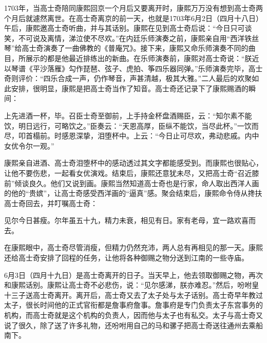 
1703年，当高士奇陪同康熙回京一个月后又要离开时，康熙万万没有想到高士奇两个月后就遽然离世。在高士奇离京的前一天，也就是1703年6月2日（四月十八日）午后，康熙邀高士奇听曲，并与其话别。康熙在见到高士奇后说：“今日只可谈笑，不可说及离情，涕泣使不尽欢。”在内廷乐师演奏之前，康熙亲自用“西洋铁丝琴”给高士奇演奏了一曲佛教的《普庵咒》。接下来，康熙又命乐师演奏不同的曲目，所展示的都是他最近排练出的新曲。在乐师演奏前，康熙对高士奇说：“朕近以琴谱《平沙落雁》勾作琵琶、弦子、虎拍、筝四乐器同弹。”乐师演奏完毕，高士奇则评价：“四乐合成一声，仍作琴音，声甚清越，极其大雅。”二人最后的欢聚如此安排，很明显，康熙是把高士奇当作了知音。高士奇还记录下了康熙赐酒的瞬间：



\begin{bookquote}上先进酒一杯，毕。召臣士奇至御前，上手持金杯盘酒赐臣，云：“知尔素不能饮，明日远行，可略饮之。”臣奏云：“天恩高厚，臣纵不能饮，当尽此杯。”一饮而尽，叩首榻前。时感恩深挚，泪堕杯中。上云：“今日止可尽欢，弗动悲戚。内中女优令尔一观。”\end{bookquote}


康熙亲自进酒、高士奇泪堕杯中的感动透过其文字都能感受到。而康熙也很贴心，让他不要伤悲，一起看女优演戏。结束后，康熙还意犹未尽，又把高士奇“召近膝前”倾谈良久。他们又说到画。康熙当然知道高士奇也是行家，命人取出西洋人画的他的“贵嫔”，让高士奇感受西洋画的“逼真”感。聚会结束后，康熙命令侍从搀扶高士奇回去，并叮嘱高士奇：



\begin{bookquote}见尔今日甚瘦。尔年虽五十九，精力未衰，相见有日。家有老母，宜一路欢喜而去。\end{bookquote}


在康熙眼中，高士奇尽管消瘦，但精力仍然充沛，两人总有再相见的那一天。康熙还给高士奇安排了回程的任务，让他将各种御赐之物分送到江南的一些寺庙。



6月3日（四月十九日）是高士奇离开的日子。当天早上，他去领取御赐之物，再次和康熙话别。康熙让高士奇不必悲伤，说：“见尔感涕，朕亦难忍。”然后，吩咐皇十三子送高士奇离开。离开后，高士奇又去了太子处与太子话别。高士奇早年教过太子，很长时间他的正式官衔都是詹事府詹事。詹事府是专门负责太子东宫事务的机构，而高士奇就是这个机构的负责人，因而他与太子也有私交。太子与高士奇又说了很久，除了送了许多礼物，还吩咐用自己的马和骡子把高士奇送往通州去乘船南下。


